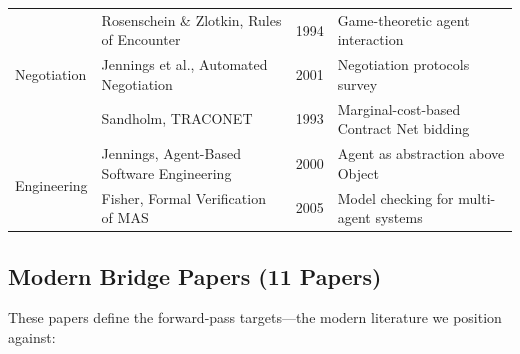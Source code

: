 \documentclass{article}
\begin{document}
\begin{table}[h]
\begin{tabular}{@{} l l r p{5.5cm} @{}}
\midrule
\multirow{3}{*}{Negotiation}
  & Rosenschein \& Zlotkin, Rules of Encounter & 1994 & Game-theoretic agent interaction \\
  & Jennings et al., Automated Negotiation & 2001 & Negotiation protocols survey \\
  & Sandholm, TRACONET & 1993 & Marginal-cost-based Contract Net bidding \\
\midrule
\multirow{2}{*}{Engineering}
  & Jennings, Agent-Based Software Engineering & 2000 & Agent as abstraction above Object \\
  & Fisher, Formal Verification of MAS & 2005 & Model checking for multi-agent systems \\
\bottomrule
\end{tabular}
\end{table}

\subsection{Modern Bridge Papers (11 Papers)}

These papers define the forward-pass targets---the modern literature we position
against:
\end{document}
